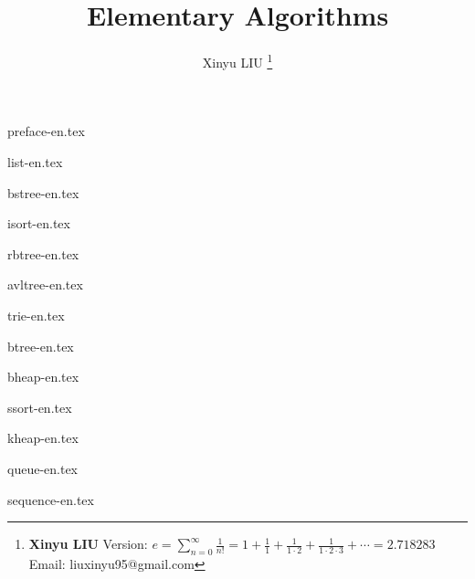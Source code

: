 \documentclass[b5paper,twoside]{book}
\begin{document}


\title{
  {\bf \Huge Elementary Algorithms}
  \centering
}

\author{Xinyu LIU
  \thanks{{\bfseries Xinyu LIU} \newline
    Version: $\displaystyle e = \sum \limits _{n=0}^{\infty }{\frac {1}{n!}} = 1 + {\frac {1}{1}}+{\frac {1}{1\cdot 2}}+{\frac {1}{1\cdot 2\cdot 3}}+\cdots = 2.718283$ \newline
    Email: liuxinyu95@gmail.com \newline
}}

\maketitle

\frontmatter
{preface-en.tex}

\tableofcontents
\newpage

\mainmatter

{list-en.tex}

{bstree-en.tex}

{isort-en.tex}

{rbtree-en.tex}

{avltree-en.tex}

{trie-en.tex}

{btree-en.tex}

{bheap-en.tex}

{ssort-en.tex}

{kheap-en.tex}

{queue-en.tex}

{sequence-en.tex}
\end{document}
